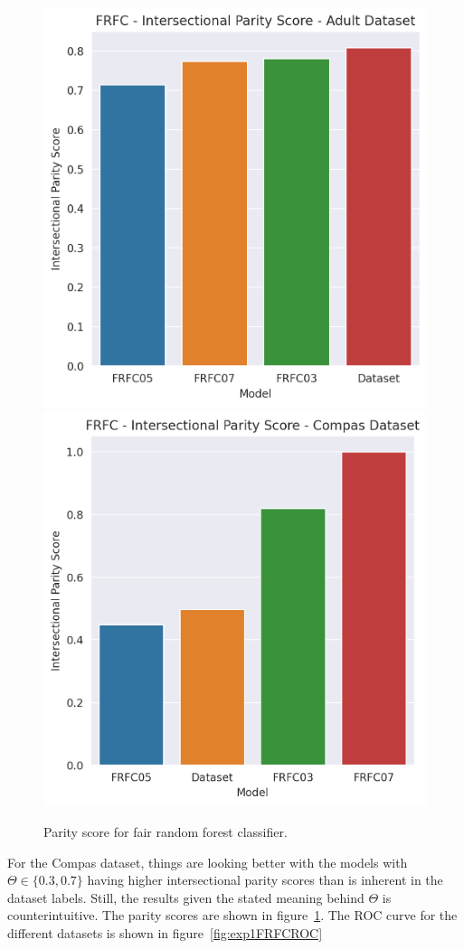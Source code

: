 \begin{figure}
    \centering
    \includegraphics[width=0.49\linewidth]{figures/adult_frfc_parity.png}
    \includegraphics[width=0.49\linewidth]{figures/compas_frfc_parity.png}
    \caption{Parity score for fair random forest classifier.}
    \label{fig:exp1FRFCparity}
\end{figure}

For the Compas dataset, things are looking better with the models with $\Theta \in \{0.3, 0.7\}$ having higher intersectional parity scores than is inherent in the dataset labels. Still, the results given the stated meaning behind $\Theta$ is counterintuitive. The parity scores are shown in figure~\ref{fig:exp1FRFCparity}. The ROC curve for the different datasets is shown in figure~\ref{fig:exp1FRFCROC}

